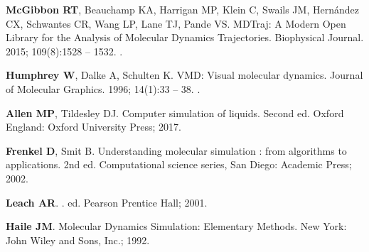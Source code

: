 \documentclass[9pt,bestpractices]{livecoms}
\providecommand{\DIFaddbegin}{} %
\providecommand{\DIFaddend}{} %
\providecommand{\DIFdelbegin}{} %
\providecommand{\DIFdelend}{} %
\begin{document}
\begin{thebibliography}{61}
	\textbf{\color{LiveCoMSMediumGrey} McGibbon RT}, Beauchamp KA, Harrigan MP,
	Klein C, Swails JM, Hernández CX, Schwantes CR, Wang LP, Lane TJ, Pande VS.
	\newblock MDTraj: A Modern Open Library for the Analysis of Molecular Dynamics
	Trajectories.
	\newblock Biophysical Journal.  2015; 109(8):1528 -- 1532.
	\newblock \DIFdelbegin %
	\DIFdelend \DIFaddbegin \href{https://dx.doi.org/10.1016/j.bpj.2015.08.015}{\doiprefix
		}\DIFaddend .
	
	\textbf{\color{LiveCoMSMediumGrey} Humphrey W}, Dalke A, Schulten K.
	\newblock VMD: Visual molecular dynamics.
	\newblock Journal of Molecular Graphics.  1996; 14(1):33 -- 38.
	\newblock \DIFdelbegin %
	\DIFdelend \DIFaddbegin \href{https://dx.doi.org/10.1016/0263-7855(96)00018-5}{\doiprefix
		}\DIFaddend .
	
	\textbf{\color{LiveCoMSMediumGrey} Allen MP}, Tildesley DJ.
	\newblock Computer simulation of liquids.
	\newblock Second ed. Oxford England: Oxford University Press; 2017.
	
	\textbf{\color{LiveCoMSMediumGrey} Frenkel D}, Smit B.
	\newblock Understanding molecular simulation : from algorithms to applications.
	\newblock 2nd ed. Computational science series, San Diego: Academic Press;
	2002.
	
	\textbf{\color{LiveCoMSMediumGrey} Leach AR}.
	.
	 ed. Pearson Prentice Hall; 2001.
	
	\textbf{\color{LiveCoMSMediumGrey} Haile JM}.
	\newblock Molecular Dynamics Simulation: Elementary Methods.
	\newblock New York: John Wiley and Sons, Inc.; 1992.
	

\end{thebibliography}
\end{document}
